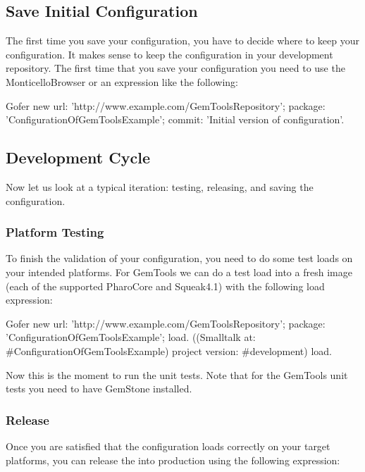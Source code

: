 \documentclass[a4paper,10pt,twoside]{book}
\begin{document}
\begin{code}{}
\begin{code}{}
\subsection{Save Initial Configuration}

The first time you save your configuration, you have to decide where to keep your configuration. It makes sense to keep the configuration in your development repository. The first time that you save your configuration you need to use the MonticelloBrowser or an expression like the following:

\begin{code}{}
  Gofer new
     url: 'http://www.example.com/GemToolsRepository';
     package: 'ConfigurationOfGemToolsExample';
     commit: 'Initial version of configuration'.
\end{code}     


\subsection{Development Cycle}
Now let us look at a typical iteration: testing, releasing, and saving the configuration.
 
\subsubsection{Platform Testing}
To finish the validation of your configuration, you need to do some test loads on your intended platforms. For GemTools we can do a test load into a fresh image (each of the supported PharoCore and Squeak4.1) with the following load expression:

\begin{code}{}
Gofer new
  url: 'http://www.example.com/GemToolsRepository';
  package: 'ConfigurationOfGemToolsExample';
  load.
((Smalltalk at: #ConfigurationOfGemToolsExample)
     project version: #development) load.
\end{code}     
     
Now this is the moment to run the unit tests. Note that for the GemTools unit tests you need to have GemStone installed.

\subsubsection{Release}
Once you are satisfied that the configuration loads correctly on your target platforms, you can release the  into production using the following expression:


\end{code}
\end{code}
\end{document}
